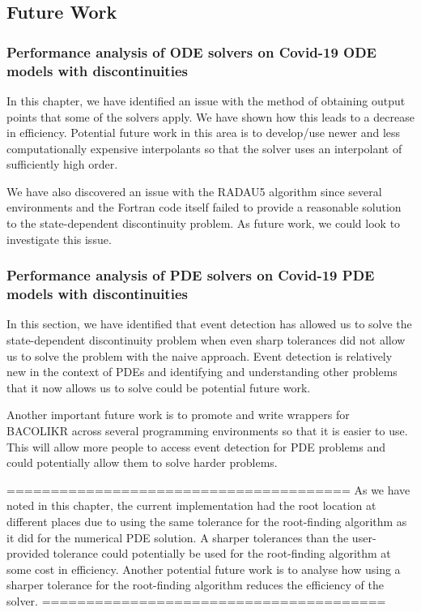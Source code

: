 \documentclass{article}
\begin{document}
\subsection{Future Work}
\subsubsection{Performance analysis of ODE solvers on Covid-19 ODE models with discontinuities}
In this chapter, we have identified an issue with the method of obtaining output points that some of the solvers apply. We have shown how this leads to a decrease in efficiency. Potential future work in this area is to develop/use newer and less computationally expensive interpolants so that the solver uses an interpolant of sufficiently high order.

We have also discovered an issue with the RADAU5 algorithm since several environments and the Fortran code itself failed to provide a reasonable solution to the state-dependent discontinuity problem. As future work, we could look to investigate this issue. 

\subsubsection{Performance analysis of PDE solvers on Covid-19 PDE models with discontinuities}
In this section, we have identified that event detection has allowed us to solve the state-dependent discontinuity problem when even sharp tolerances did not allow us to solve the problem with the naive approach. Event detection is relatively new in the context of PDEs and identifying and understanding other problems that it now allows us to solve could be potential future work.

Another important future work is to promote and write wrappers for BACOLIKR across several programming environments so that it is easier to use. This will allow more people to access event detection for PDE problems and could potentially allow them to solve harder problems. 

=======================================
As we have noted in this chapter, the current implementation had the root location at different places due to using the same tolerance for the root-finding algorithm as it did for the numerical PDE solution. A sharper tolerances than the user-provided tolerance could potentially be used for the root-finding algorithm at some cost in efficiency. Another potential future work is to analyse how using a sharper tolerance for the root-finding algorithm reduces the efficiency of the solver.
=======================================
\end{document}
